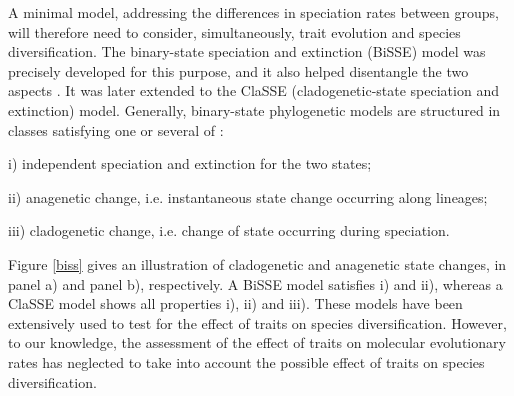 \documentclass[a4paper,11pt]{article}
\theoremstyle{plain}
\theoremstyle{definition}
\numberwithin{equation}{section}
\begin{document}
A minimal model, addressing the differences in speciation rates
between groups, will therefore need to consider, simultaneously, trait
evolution and species diversification.  The binary-state speciation
and extinction (BiSSE) model was precisely developed for this purpose, 
and it also helped disentangle the two aspects \cite{maddison_etal}. It was later
extended to the ClaSSE (cladogenetic-state speciation and extinction)
model. Generally, binary-state phylogenetic models are
structured in classes satisfying one or several of \cite{goldberg_igic}:

\noindent i) independent speciation and extinction for the two states;

\noindent ii) anagenetic change, i.e. instantaneous state change occurring along lineages;

\noindent iii) cladogenetic change, i.e. change of state occurring during speciation.

Figure \ref{biss} gives an illustration of 
cladogenetic and anagenetic state changes, in panel a) 
and panel b), respectively. A BiSSE model satisfies i) and ii), whereas a ClaSSE model shows all
properties i), ii) and iii). These models have been extensively used 
to test for the effect of traits on species diversification. However, to our 
knowledge, the assessment of the effect of traits on molecular evolutionary 
rates has neglected to take into account the possible effect of traits on species diversification.
\end{document}
